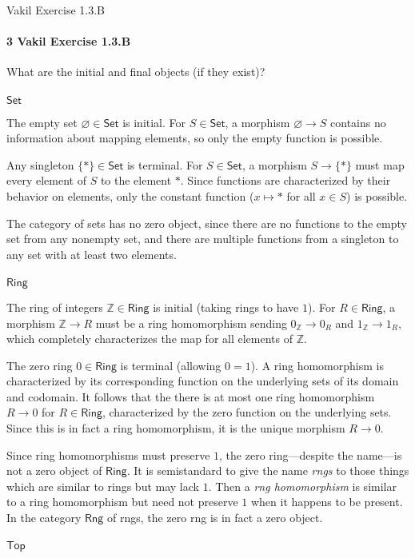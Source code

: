 \documentclass[12pt]{article}
\newlength{\myparskip}
\newenvironment{fullbox}{\begin{lrbox}{\savefullbox}\begin{minipage}{\dimexpr\textwidth-2\fboxsep\relax}\setlength{\parskip}{\myparskip}}{\end{minipage}\end{lrbox}\framebox[\textwidth]{\usebox{\savefullbox}}}
\newenvironment{pbox}[1][]{\begin{fullbox}\ifx#1\empty\else\paragraph{#1}\phantom{}\fi}{\end{fullbox}}
\theoremstyle{definition}
\newcommand{\Z}{\mathbb{Z}}
\renewcommand{\emptyset}{\varnothing}
\newcommand{\<}{\langle}
\renewcommand{\>}{\rangle}
\newcommand{\Set}{\mathsf{Set}}
\newcommand{\Ring}{\mathsf{Ring}}
\newcommand{\Top}{\mathsf{Top}}
\begin{document}
\newpage
\begin{pbox}[3 Vakil Exercise 1.3.B]
    What are the initial and final objects (if they exist)?
\end{pbox}

\begin{pbox}
    $\Set$
\end{pbox}

The empty set $\emptyset \in \Set$ is initial.
For $S \in \Set$, a morphism $\emptyset \to S$ contains no information about mapping elements, so only the empty function is possible.

Any singleton $\{*\} \in \Set$ is terminal.
For $S \in \Set$, a morphism $S \to \{*\}$ must map every element of $S$ to the element $*$.
Since functions are characterized by their behavior on elements, only the constant function ($x \mapsto *$ for all $x \in S$) is possible.

The category of sets has no zero object, since there are no functions to the empty set from any nonempty set, and there are multiple functions from a singleton to any set with at least two elements.

\begin{pbox}
    $\Ring$
\end{pbox}

The ring of integers $\Z \in \Ring$ is initial (taking rings to have $1$).
For $R \in \Ring$, a morphism $\Z \to R$ must be a ring homomorphism sending $0_\Z \to 0_R$ and $1_\Z \to 1_R$, which completely characterizes the map for all elements of $\Z$.

The zero ring $0 \in \Ring$ is terminal (allowing $0 = 1$).
A ring homomorphism is characterized by its corresponding function on the underlying sets of its domain and codomain.
It follows that the there is at most one ring homomorphism $R \to 0$ for $R \in \Ring$, characterized by the zero function on the underlying sets.
Since this is in fact a ring homomorphism, it is the unique morphism $R \to 0$.

Since ring homomorphisms must preserve $1$, the zero ring---despite the name---is not a zero object of $\Ring$.
It is semistandard to give the name \textit{rngs} to those things which are similar to rings but may lack $1$.
Then a \textit{rng homomorphism} is similar to a ring homomorphism but need not preserve $1$ when it happens to be present.
In the category $\mathsf{Rng}$ of rngs, the zero rng is in fact a zero object.

\begin{pbox}
    $\Top$
\end{pbox}
\end{document}
